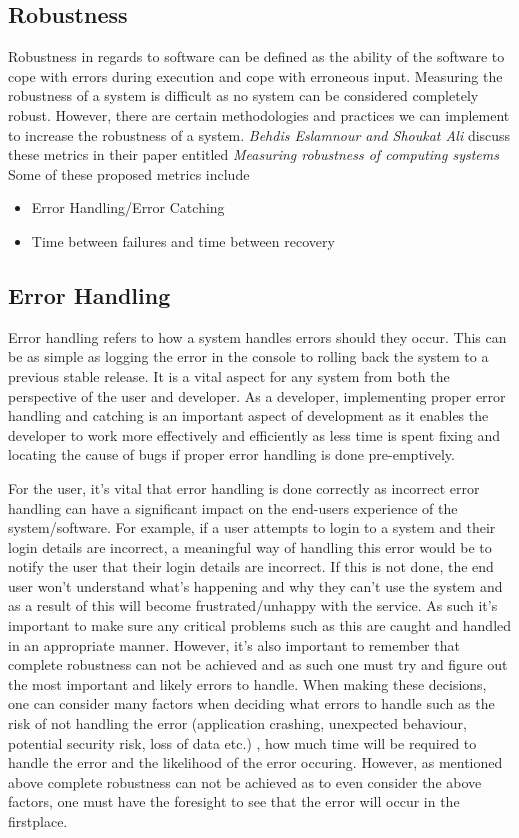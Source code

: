   \subsection{Robustness}
  Robustness in regards to software can be defined as the ability of the software to cope with errors during execution and cope with erroneous input. Measuring the robustness of a system is difficult 
  as no system can be considered completely robust. However, there are certain methodologies and practices we can implement to increase the robustness of a system. {\textit{Behdis Eslamnour and Shoukat Ali}} discuss these metrics in their paper entitled {\textit{Measuring robustness of computing systems}}\cite{SoftwareRobustness}
  Some of these proposed metrics include
    \newline
    \begin{itemize}
      \item Error Handling/Error Catching
      \item Time between failures and time between recovery
    \end{itemize}

    \subsection{Error Handling}
    Error handling refers to how a system handles errors should they occur. This can be as simple as logging the error in the console to rolling back the system to a previous stable release.
    It is a vital aspect for any system from both the perspective of the user and developer. As a developer, implementing proper error handling and catching is an important aspect of development
    as it enables the developer to work more effectively and efficiently as less time is spent fixing and locating the cause of bugs if proper error handling is done pre-emptively.

    For the user, it's vital that error handling is done correctly as incorrect error handling can have a significant impact on the end-users experience of the system/software. For example, if a user
    attempts to login to a system and their login details are incorrect, a meaningful way of handling this error would be to notify the user that their login details are incorrect. If this is not done, 
    the end user won't understand what's happening and why they can't use the system and as a result of this will become frustrated/unhappy with the service. As such it's important to make sure any critical
    problems such as this are caught and handled in an appropriate manner. However, it's also important to remember that complete robustness can not be achieved and as such one must try and figure out the 
    most important and likely errors to handle. When making these decisions, one can consider many factors when deciding what errors to handle such as the risk of not handling the error (application crashing, unexpected behaviour, potential security risk, loss of data etc.)
    , how much time will be required to handle the error and the likelihood of the error occuring. However, as mentioned above complete robustness can not be achieved as to even consider the above factors,
    one must have the foresight to see that the error will occur in the firstplace.

